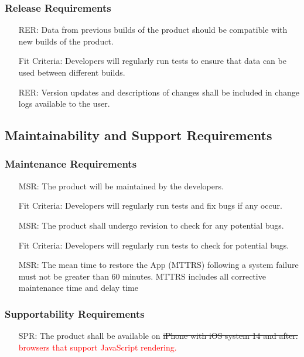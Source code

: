 \documentclass[12pt]{article}
\newcounter{reqnum} %
\newcounter{rerreqnum} %
\newcounter{msrreqnum} %
\newcounter{sprreqnum} %
\begin{document}
\subsubsection{Release Requirements}
\begin{itemize}
    \item[RER\refstepcounter{rerreqnum}\thererreqnum \label{R_Inputs}:] Data from previous builds of the product should be compatible with new builds of the product.
    \item[] Fit Criteria: Developers will regularly run tests to ensure that data can be used between different builds.
    \item[RER\refstepcounter{rerreqnum}\thererreqnum \label{R_Inputs}:] Version updates and descriptions of changes shall be included in change logs available to the user.
\end{itemize}

\subsection{Maintainability and Support Requirements}
\subsubsection{Maintenance Requirements}
\begin{itemize}
    \item[MSR\refstepcounter{msrreqnum}\themsrreqnum \label{R_Inputs}:] 
    The product will be maintained by the developers.
    \item[] Fit Criteria: Developers will regularly run tests and fix bugs if any occur.
    \item[MSR\refstepcounter{msrreqnum}\themsrreqnum \label{R_Inputs}:] 
    The product shall undergo revision to check for any potential bugs.
    \item[] Fit Criteria: Developers will regularly run tests to check for potential bugs.
    \item[MSR\refstepcounter{msrreqnum}\themsrreqnum \label{R_Inputs}:] 
    The mean time to restore the App (MTTRS) following a system failure must not be greater than 60 minutes. MTTRS includes all corrective maintenance time and delay time
\end{itemize}
\subsubsection{Supportability Requirements}
\begin{itemize}
    \item[SPR\refstepcounter{sprreqnum}\thesprreqnum \label{R_Inputs}:] 
    The product shall be available on \sout{iPhone with iOS system 14 and after.} \textcolor{red}{browsers that support JavaScript rendering.}
\end{itemize}
\end{document}
